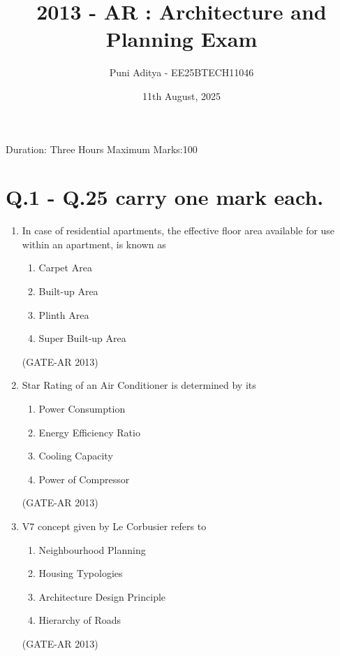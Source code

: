 \documentclass[a4paper,10pt]{article}
\begin{document}
\title{2013 - AR : Architecture and Planning Exam}
\author{Puni Aditya - EE25BTECH11046}
\date{11th August, 2025}
\maketitle
Duration: Three Hours \hfill Maximum Marks:100

\section*{Q.1 - Q.25 carry one mark each.}

\begin{enumerate}
    \item In case of residential apartments, the effective floor area available for use within an apartment, is known as 
    \begin{multicols}{2}
    \begin{enumerate}
        \item Carpet Area
        \item Built-up Area
        \item Plinth Area
        \item Super Built-up Area
    \end{enumerate}
    \end{multicols}
    \hfill (GATE-AR 2013)
    
    \item Star Rating of an Air Conditioner is determined by its 
    \begin{multicols}{2}
	\begin{enumerate}
        \item Power Consumption
        \item Energy Efficiency Ratio
        \item Cooling Capacity
        \item Power of Compressor
    \end{enumerate}
	\end{multicols}
    \hfill (GATE-AR 2013)
    
    \item V7 concept given by Le Corbusier refers to 
    \begin{multicols}{2}
	\begin{enumerate}
        \item Neighbourhood Planning
        \item Housing Typologies
        \item Architecture Design Principle
        \item Hierarchy of Roads
    \end{enumerate}
	\end{multicols}
    \hfill (GATE-AR 2013)
    

\end{enumerate}
\end{document}
